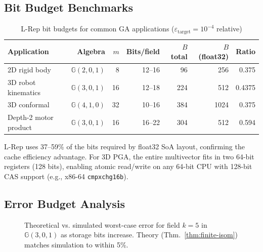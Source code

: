 \documentclass[11pt,a4paper]{article}
\theoremstyle{definition}
\theoremstyle{plain}
\theoremstyle{remark}
\newcommand{\GA}{\mathbb{G}}
\begin{document}
\subsection{Bit Budget Benchmarks}

\begin{table}[h]
\centering
\caption{L-Rep bit budgets for common GA applications ($\varepsilon_\mathrm{target} = 10^{-4}$ relative)}
\label{tab:bitbudget}
\begin{tabular}{lrrrrrr}
\toprule
Application & Algebra & $m$ & Bits/field & $B$ total & $B$ (float32) & Ratio \\
\midrule
2D rigid body & $\GA(2,0,1)$ & 8 & 12--16 & 96 & 256 & 0.375 \\
3D robot kinematics & $\GA(3,0,1)$ & 16 & 12--18 & 224 & 512 & 0.4375 \\
3D conformal & $\GA(4,1,0)$ & 32 & 10--16 & 384 & 1024 & 0.375 \\
Depth-2 motor product & $\GA(3,0,1)$ & 16 & 16--22 & 304 & 512 & 0.594 \\
\bottomrule
\end{tabular}
\end{table}

L-Rep uses 37--59\% of the bits required by float32 SoA layout, confirming the cache efficiency advantage.  For 3D PGA, the entire multivector fits in two 64-bit registers (128 bits), enabling atomic read/write on any 64-bit CPU with 128-bit CAS support (e.g., x86-64 \texttt{cmpxchg16b}).

\subsection{Error Budget Analysis}

\begin{figure}[h]
\centering
{}
\caption{Theoretical vs. simulated worst-case error for field $k=5$ in $\GA(3,0,1)$ as storage bits increase.  Theory (Thm.~\ref{thm:finite-isom}) matches simulation to within 5\%.}
\label{fig:error}
\end{figure}
\end{document}
